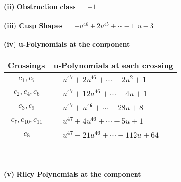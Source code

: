 \documentclass[1p]{elsarticle_modified}
\theoremstyle{definition}
\begin{document}
\flushleft \textbf{(ii) Obstruction class $= -1$}\\~\\
\flushleft \textbf{(iii) Cusp Shapes $= - u^{46}+2 u^{45}+\cdots-11 u-3$}\\~\\
\newpage\renewcommand{\arraystretch}{1}
\flushleft \textbf{(iv) u-Polynomials at the component}\newline \\
\begin{tabular}{m{50pt}|m{274pt}}
Crossings & \hspace{64pt}u-Polynomials at each crossing \\
\hline $$\begin{aligned}c_{1},c_{5}\end{aligned}$$&$\begin{aligned}
&u^{47}+2 u^{46}+\cdots-2 u^2+1
\end{aligned}$\\
\hline $$\begin{aligned}c_{2},c_{4},c_{6}\end{aligned}$$&$\begin{aligned}
&u^{47}+12 u^{46}+\cdots+4 u+1
\end{aligned}$\\
\hline $$\begin{aligned}c_{3},c_{9}\end{aligned}$$&$\begin{aligned}
&u^{47}+u^{46}+\cdots+28 u+8
\end{aligned}$\\
\hline $$\begin{aligned}c_{7},c_{10},c_{11}\end{aligned}$$&$\begin{aligned}
&u^{47}+4 u^{46}+\cdots+5 u+1
\end{aligned}$\\
\hline $$\begin{aligned}c_{8}\end{aligned}$$&$\begin{aligned}
&u^{47}-21 u^{46}+\cdots-112 u+64
\end{aligned}$\\
\hline
\end{tabular}\\~\\
\newpage\renewcommand{\arraystretch}{1}
\flushleft \textbf{(v) Riley Polynomials at the component}\newline \\
\end{document}
